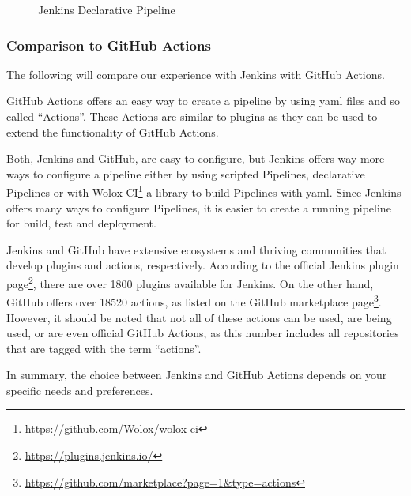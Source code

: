\begin{figure}[h]
    \caption{Jenkins Declarative Pipeline}
    
    \label{fig:jenkins-declarative-pipeline}
\end{figure}

\subsubsection{Comparison to GitHub Actions}\label{subsubsec:comparison-to-github-actions}
The following will compare our experience with Jenkins with GitHub Actions.

GitHub Actions offers an easy way to create a pipeline by using yaml files and so called ``Actions''.
These Actions are similar to plugins as they can be used to extend the functionality of GitHub Actions.

Both, Jenkins and GitHub, are easy to configure, but Jenkins offers way more ways to configure a pipeline either by using scripted Pipelines, declarative Pipelines or with Wolox CI\footnote{\url{https://github.com/Wolox/wolox-ci}} a library to build Pipelines with yaml.
Since Jenkins offers many ways to configure Pipelines, it is easier to create a running pipeline for build, test and deployment.

Jenkins and GitHub have extensive ecosystems and thriving communities that develop plugins and actions, respectively.
According to the official Jenkins plugin page\footnote{\url{https://plugins.jenkins.io/}}, there are over 1800 plugins available for Jenkins.
On the other hand, GitHub offers over 18520 actions, as listed on the GitHub marketplace page\footnote{\url{https://github.com/marketplace?page=1&type=actions}}.
However, it should be noted that not all of these actions can be used, are being used, or are even official GitHub Actions, as this number includes all repositories that are tagged with the term ``actions''.

In summary, the choice between Jenkins and GitHub Actions depends on your specific needs and preferences.
